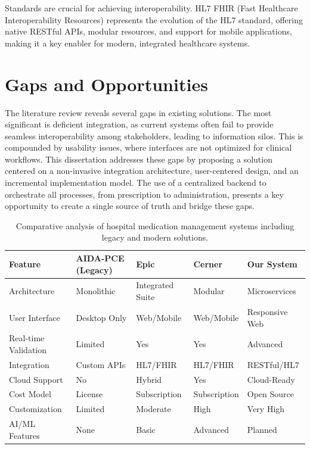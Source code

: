 Standards are crucial for achieving interoperability. HL7 FHIR (Fast Healthcare Interoperability Resources) represents the evolution of the HL7 standard, offering native RESTful APIs, modular resources, and support for mobile applications, making it a key enabler for modern, integrated healthcare systems.

\section{Gaps and Opportunities}

The literature review reveals several gaps in existing solutions. The most significant is deficient integration, as current systems often fail to provide seamless interoperability among stakeholders, leading to information silos. This is compounded by usability issues, where interfaces are not optimized for clinical workflows. This dissertation addresses these gaps by proposing a solution centered on a non-invasive integration architecture, user-centered design, and an incremental implementation model. The use of a centralized backend to orchestrate all processes, from prescription to administration, presents a key opportunity to create a single source of truth and bridge these gaps.

\begin{table}[H]
    \centering
    \caption{Comparative analysis of hospital medication management systems including legacy and modern solutions.}
    \label{tab:comparison}
    \begin{tabularx}{\textwidth}{@{}l|X|X|X|X@{}}
        \toprule
        \textbf{Feature} & \textbf{AIDA-PCE (Legacy)} & \textbf{Epic} & \textbf{Cerner} & \textbf{Our System} \\
        \midrule
        Architecture & Monolithic & Integrated Suite & Modular & Microservices \\
        User Interface & Desktop Only & Web/Mobile & Web/Mobile & Responsive Web \\
        Real-time Validation & Limited & Yes & Yes & Advanced \\
        Integration & Custom APIs & HL7/FHIR & HL7/FHIR & RESTful/HL7 \\
        Cloud Support & No & Hybrid & Yes & Cloud-Ready \\
        Cost Model & License & Subscription & Subscription & Open Source \\
        Customization & Limited & Moderate & High & Very High \\
        AI/ML Features & None & Basic & Advanced & Planned \\
        \bottomrule
    \end{tabularx}
\end{table}

